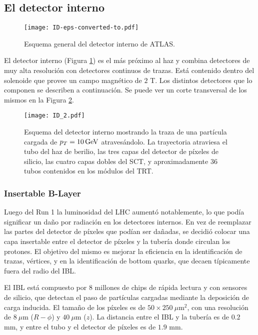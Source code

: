 \subsection{El detector interno}

\begin{figure}
\centering
\texttt{[image: ID-eps-converted-to.pdf]}
\caption{Esquema general del detector interno de ATLAS.}
\label{ID}
\end{figure}

El detector interno (Figura \ref{ID}) es el más próximo al haz y combina detectores de muy alta resolución con detectores continuos de trazas. Está contenido dentro del solenoide que provee un campo magnético de $2$ T. Los distintos detectores que lo componen se describen a continuación. Se puede ver un corte transversal de los mismos en la Figura \ref{ID_2}.

\begin{figure}
\centering
\texttt{[image: ID\_2.pdf]}
\caption{Esquema del detector interno mostrando la traza de una partícula cargada de $p_{T}=10 \, \mathrm{GeV}$ atravesándolo. La trayectoria atraviesa el tubo del haz de  berilio, las tres capas del detector de píxeles de silicio, las cuatro capas dobles del SCT, y aproximadamente 36 tubos contenidos en los módulos del TRT.}
\label{ID_2}
\end{figure}

\subsubsection{Insertable B-Layer}

Luego del Run 1 la luminosidad del LHC aumentó notablemente, lo que podía significar un daño por radiación en los detectores internos. En vez de reemplazar las partes del detector de píxeles que podían ser dañadas, se decidió colocar una capa insertable entre el detector de píxeles y la tubería donde circulan los protones. El objetivo del mismo es mejorar la eficiencia en la identificación de trazas, vértices, y en la identificación de bottom quarks, que decaen típicamente fuera del radio del IBL.

El IBL está compuesto por $8$ millones de chips de rápida lectura y con sensores de silicio, que detectan el paso de partículas cargadas mediante la deposición de carga inducida. El tamaño de los píxeles es de $50\times250\:\mu$m$^{2}$, con una resolución de $8\:\mu$m ($R-\phi$) y $40\:\mu$m ($z$). La distancia entre el IBL y la tubería es de $0.2$ mm, y entre el tubo y el detector de píxeles es de $1.9$ mm. 

